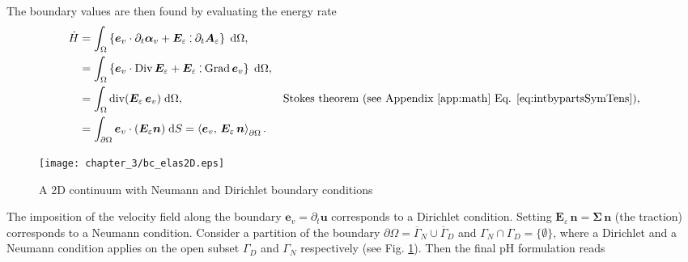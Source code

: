 The boundary values are then found by evaluating the energy rate
\begin{equation}\label{eq:enrateElas}
\begin{aligned}
\dot{H} &= \int_{\Omega} \left\{ \bm{e}_v \cdot \partial_t \bm\alpha_v + \bm{E}_\varepsilon \cddot \partial_t \bm{A}_\varepsilon \right\} \d\Omega, \\
&= \int_{\Omega} \left\{\bm{e}_v \cdot \Div \bm{E}_\varepsilon + \bm{E}_\varepsilon \cddot \Grad \bm{e}_v \right\}\d\Omega,\\
&= \int_{\Omega} \div(\bm{E}_\varepsilon \, \bm{e}_v) \d\Omega, \qquad &\text{Stokes theorem (see  Appendix \ref{app:math} Eq. \eqref{eq:intbypartsSymTens}}), \\
&= \int_{\partial \Omega} \bm{e}_v \cdot (\bm{E}_\varepsilon\bm{n}) \d{S} = \inner[\partial\Omega]{\bm{e}_v}{\bm{E}_\varepsilon \, \bm{n}}.
\end{aligned}
\end{equation}

\begin{figure}
\centering
\texttt{[image: chapter\_3/bc\_elas2D.eps]}
\caption{A 2D continuum with Neumann and Dirichlet boundary conditions}
\label{fig:bc_elas2D}
\end{figure}
The imposition of the velocity field along the boundary $\bm{e}_v = \partial_t \bm{u}$ corresponds to a Dirichlet condition. Setting $\bm{E}_\varepsilon \, \bm{n} = \bm{\Sigma} \,  \bm{n}$ (the traction) corresponds to a Neumann condition. Consider a partition of the boundary $\partial\Omega = \overline{\Gamma}_N \cup \overline{\Gamma}_D$ and $\Gamma_N \cap \Gamma_D =  \{\emptyset\}$, where a Dirichlet and a Neumann condition applies on the open subset $\Gamma_D$ and $\Gamma_N$ respectively (see Fig. \ref{fig:bc_elas2D}). Then the final pH formulation reads

